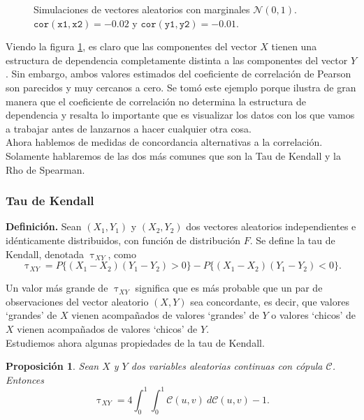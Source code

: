 \documentclass[11pt,a4paper]{article}
\newcommand{\C}{\mathcal{C}}
\newtheorem{proposition}{Proposición}[subsection]
\begin{document}
\begin{figure}
    \caption{Simulaciones de vectores aleatorios con marginales $\mathcal{N}(0, 1)$. $\mathtt{cor(x1, x2)} = -0.02$ y $\mathtt{cor(y1, y2)} = -0.01$.}
    \label{fig:panel_corr}
\end{figure}

Viendo la figura \ref{fig:panel_corr}, es claro que las componentes del vector $X$ tienen una estructura de dependencia completamente distinta a las componentes del vector $Y$. Sin embargo, ambos valores estimados del coeficiente de correlación de Pearson son parecidos y muy cercanos a cero. Se tomó este ejemplo porque ilustra de gran manera que el coeficiente de correlación no determina la estructura de dependencia y resalta lo importante que es visualizar los datos con los que vamos a trabajar antes de lanzarnos a hacer cualquier otra cosa.\\

Ahora hablemos de medidas de concordancia alternativas a la correlación. Solamente hablaremos de las dos más comunes que son la Tau de Kendall y la Rho de Spearman.\\


\subsubsection{Tau de Kendall}
\textbf{Definición.} Sean $(X_1, Y_1)$ y $(X_2, Y_2)$ dos vectores aleatorios independientes e idénticamente distribuidos, con función de distribución $F$. Se define la tau de Kendall, denotada $\uptau_{XY}$, como $$\uptau_{XY} = P\{(X_1-X_2)(Y_1-Y_2)>0\} - P\{(X_1-X_2)(Y_1-Y_2)<0\}.$$

Un valor más grande de $\uptau_{XY}$ significa que es más probable que un par de observaciones del vector aleatorio $(X, Y)$ sea concordante, es decir, que valores `grandes' de $X$ vienen acompañados de valores `grandes' de $Y$ o valores `chicos' de $X$ vienen acompañados de valores `chicos' de $Y$.\\

Estudiemos ahora algunas propiedades de la tau de Kendall.

\begin{proposition}
Sean $X$ y $Y$ dos variables aleatorias continuas con cópula $\C$. Entonces
$$\uptau_{XY} = 4\int_{0}^1\int_{0}^1\C(u, v) \ d\C(u, v) - 1.$$ 
\end{proposition}
\end{document}

